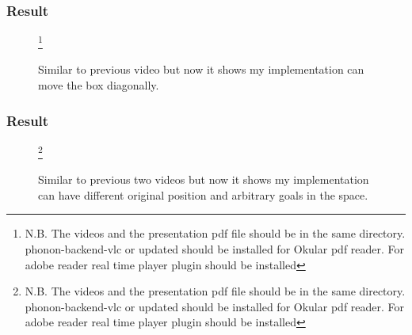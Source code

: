 \documentclass[11pt]{beamer}
\begin{document}
\begin{frame}
\frametitle{Result}
\begin{figure}
\centering
{}
\caption{Similar to previous video but now it shows my implementation can move the box diagonally.}
\footnote{N.B. The videos and the presentation pdf file should be in the same directory. phonon-backend-vlc or updated should be installed for Okular pdf reader. For adobe reader real time player plugin should be installed}
\end{figure}
\end{frame}

\begin{frame}
\frametitle{Result}
\begin{figure}
\centering
{}
\caption{Similar to previous two videos but now it shows my implementation can have different original position and arbitrary goals in the space.}
\footnote{N.B. The videos and the presentation pdf file should be in the same directory. phonon-backend-vlc or updated should be installed for Okular pdf reader. For adobe reader real time player plugin should be installed}
\end{figure}
\end{frame}
\end{document}
